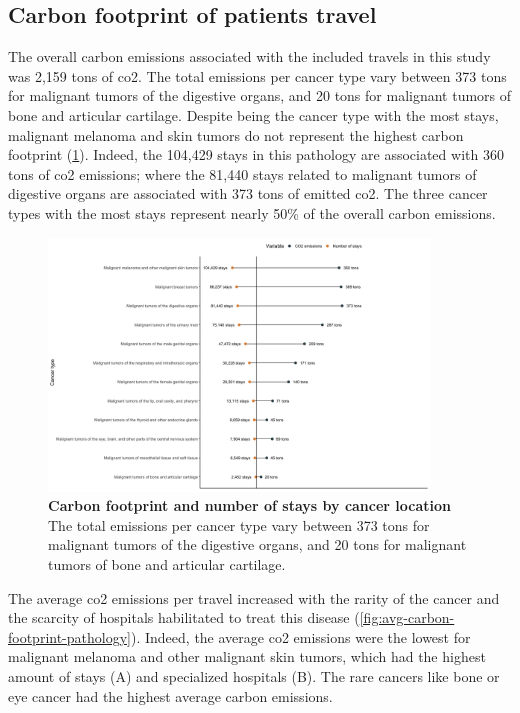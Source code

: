 \subsection{Carbon footprint of patients travel}

The overall carbon emissions associated with the included travels in this study
was 2,159 tons of \ac{co2}. The total emissions per cancer type vary between 373
tons for malignant tumors of the digestive organs, and 20 tons for malignant
tumors of bone and articular cartilage. Despite being the cancer type with the
most stays, malignant melanoma and skin tumors do not represent the highest
carbon footprint (\cref{fig:carbon-footprint-pathology}). Indeed, the 104,429
stays in this pathology are associated with 360 tons of \ac{co2} emissions;
where the 81,440 stays related to malignant tumors of digestive organs are
associated with 373 tons of emitted \ac{co2}. The three cancer types with the
most stays represent nearly 50\% of the overall carbon emissions.

\begin{figure}[h!]
    \includegraphics[width=0.9\textwidth]{images/routes/fig12.png}
    \centering
    \caption{
        \textbf{Carbon footprint and number of stays by cancer location}
        The total emissions per cancer type vary between 373 tons for
        malignant tumors of the digestive organs, and 20 tons for malignant tumors
        of bone and articular cartilage.}
    \label{fig:carbon-footprint-pathology}
\end{figure}

The average \ac{co2} emissions per travel increased with the rarity of the
cancer and the scarcity of hospitals habilitated to treat this disease
(\cref{fig:avg-carbon-footprint-pathology}). Indeed, the average \ac{co2}
emissions were the lowest for malignant melanoma and other malignant skin
tumors, which had the highest amount of stays (A) and specialized hospitals
(B). The rare cancers like bone or eye cancer had the highest average
carbon emissions.

